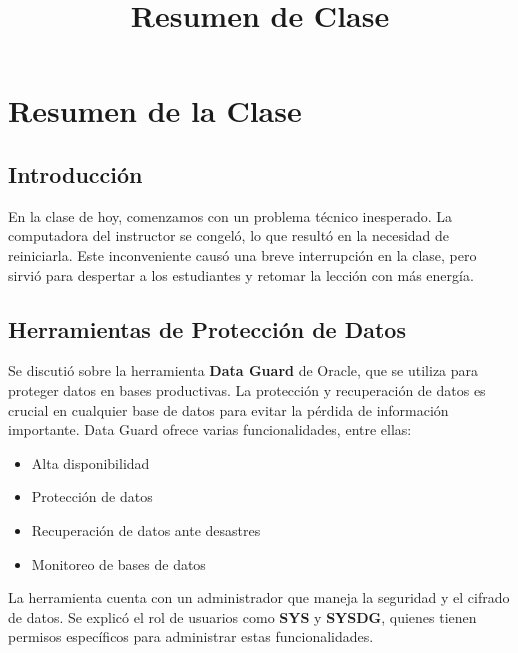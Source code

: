 \documentclass[12pt]{article}
\title{Resumen de Clase}
\author{}
\date{}
\begin{document}
\maketitle

\section*{Resumen de la Clase}

\subsection*{Introducción}
En la clase de hoy, comenzamos con un problema técnico inesperado. La computadora del instructor se congeló, lo que resultó en la necesidad de reiniciarla. Este inconveniente causó una breve interrupción en la clase, pero sirvió para despertar a los estudiantes y retomar la lección con más energía.

\subsection*{Herramientas de Protección de Datos}
Se discutió sobre la herramienta \textbf{Data Guard} de Oracle, que se utiliza para proteger datos en bases productivas. La protección y recuperación de datos es crucial en cualquier base de datos para evitar la pérdida de información importante. Data Guard ofrece varias funcionalidades, entre ellas:
\begin{itemize}
    \item Alta disponibilidad
    \item Protección de datos
    \item Recuperación de datos ante desastres
    \item Monitoreo de bases de datos
\end{itemize}
La herramienta cuenta con un administrador que maneja la seguridad y el cifrado de datos. Se explicó el rol de usuarios como \textbf{SYS} y \textbf{SYSDG}, quienes tienen permisos específicos para administrar estas funcionalidades.
\end{document}
